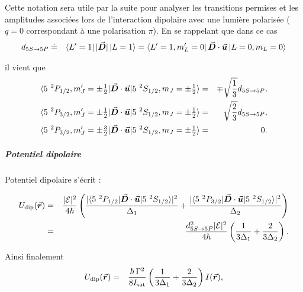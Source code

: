 Cette notation sera utile par la suite pour analyser les transitions permises et les amplitudes associées lors de l’interaction dipolaire avec une lumière polarisée ($q = 0$ correspondant à une polarisation $\pi$). En se rappelant que dans ce cas 
\begin{eqnarray*}
	d_{\scriptstyle 5S \rightarrow 5P} & \doteq &\bra{L'=1} \vert \vec{{\bm{D}}} \vert \ket{L=1} = \bra{L'=1 , m_L' =0 }  \vec{{\bm{D}}} \cdot \vec{{\bm{u}}} \ket{L=0 , m_L = 0 }	
\end{eqnarray*}

il vient que 
\begin{eqnarray*}
	\langle 5 {~}^2P_{1/2} , m_J' = \pm\tfrac12 \vert \vec{{\bm{D}}} \cdot \vec{{\bm{u}}}\vert 5 {~}^2S_{1/2} , m_J = \pm  \tfrac12 \rangle	 &=& \mp  \sqrt{\frac{1}{3}} d_{\scriptstyle 5S \rightarrow 5P},\\
	\langle 5 {~}^2P_{3/2} , m_J' = \pm \tfrac12 \vert \vec{{\bm{D}}} \cdot \vec{{\bm{u}}}\vert 5 {~}^2S_{1/2} , m_J = \pm  \tfrac12 \rangle	 &=& \sqrt{\frac{2}{3}} d_{\scriptstyle 5S \rightarrow 5P} , \\
	\langle 5 {~}^2P_{3/2} , m_J' = \pm \tfrac32 \vert \vec{{\bm{D}}} \cdot \vec{{\bm{u}}}\vert 5 {~}^2S_{1/2} , m_J = \pm  \tfrac12 \rangle & = & 0 .
\end{eqnarray*}


\subparagraph{Potentiel dipolaire}

Potentiel dipolaire s'écrit :

\begin{eqnarray*}
	U_{\mathrm{dip}}(\operatorvec{r}) &  = & \frac{ \vert \mathcal{E} \vert^2}{4 \hbar} \left( \frac{ \vert \langle 5 {~}^2P_{1/2}  \vert \operatorvec{D} \cdot \operatorvec{u}\vert 5 {~}^2S_{1/2}  \rangle \vert^2}{ \Delta_1} + \frac{ \vert\langle 5 {~}^2P_{3/2}  \vert \operatorvec{D} \cdot \operatorvec{u}\vert 5 {~}^2S_{1/2}  \rangle \vert^2}{ \Delta_2}  \right )\\ & = &  \frac{  d_{\scriptstyle \tiny  5S \rightarrow 5P}^2 \vert \mathcal{E} \vert^2 }{4 \hbar} \left( \frac{ 1}{ 3 \Delta_1} + \frac{2 }{ 3 \Delta_2}  \right ).		
\end{eqnarray*}

Ainsi finalement 
\begin{eqnarray}
	U_{\mathrm{dip}}(\vec{{\bm{r}}}) &=& \frac{\hbar \, \Gamma^2}{8 I_{\mathrm{sat}}} \left( \frac{ 1}{ 3 \Delta_1} + \frac{2 }{ 3 \Delta_2}  \right ) I(\vec{{\bm{r}}}) ,	
\end{eqnarray}

